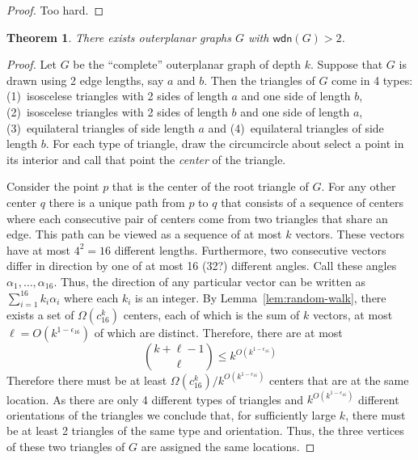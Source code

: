\documentclass{article}
\newtheorem{thm}{Theorem}
\newcommand{\wdn}{\mathsf{wdn}}
\begin{document}
\begin{proof}
Too hard.
\end{proof}

\begin{thm}
There exists outerplanar graphs $G$ with $\wdn(G) > 2$.
\end{thm}

\begin{proof}
Let $G$ be the ``complete'' outerplanar graph of depth $k$.  Suppose
that $G$ is drawn using 2 edge lengths, say $a$ and $b$.  Then the
triangles of $G$ come in 4 types: (1)~isoscelese triangles with 2
sides of length $a$ and one side of length $b$, (2)~isoscelese
triangles with 2 sides of length $b$ and one side of length $a$,
(3)~equilateral triangles of side length $a$ and (4)~equilateral
triangles of side length $b$.  For each type of triangle, draw the
circumcircle about select a
point in its interior and call that point the \emph{center} of the
triangle.

Consider the point $p$ that is the center of the root triangle of $G$.
For any other center $q$ there is a unique path from $p$ to $q$ that
consists of a sequence of centers where each consecutive pair of
centers come from two triangles that share an edge.  This path can be
viewed as a sequence of at most $k$ vectors.  These vectors have at
most $4^2=16$ different lengths.  Furthermore, two consecutive vectors
differ in direction by one of at most 16 (32?) different angles.  Call
these angles $\alpha_1,\ldots,\alpha_{16}$.  Thus, the direction of
any particular vector can be written as $\sum_{i=1}^{16} k_i\alpha_i$
where each $k_i$ is an integer.  By Lemma~\ref{lem:random-walk}, there
exists a set of $\Omega(c_{16}^k)$ centers, each of which is the sum
of $k$ vectors, at most $\ell=O(k^{1-\epsilon_{16}})$ of which are
distinct.  Therefore, there are at most
\[
     {k+\ell-1 \choose \ell} \le k^{O(k^{1-\epsilon_{16}})}    
\]
Therefore there must be at least
$\Omega(c_{16}^k)/k^{O(k^{1-\epsilon_{16}})}$ centers that are at the
same location.  As there are only 4 different types of triangles and
$k^{O(k^{1-\epsilon_{16}})}$ different orientations of the triangles we
conclude that, for sufficiently large $k$, there must be at least 2
triangles of the same type and orientation.  Thus, the three vertices
of these two triangles of $G$ are assigned the same locations.
\end{proof}
\end{document}
